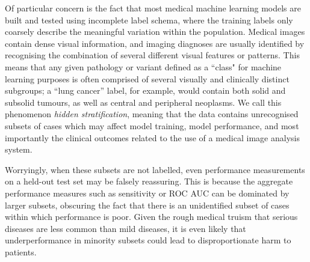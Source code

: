 \documentclass{article}
\begin{document}
Of particular concern is the fact that most medical machine learning models are built and tested using incomplete label schema, where the training labels only coarsely describe the meaningful variation within the population. 
Medical images contain dense visual information, and imaging diagnoses are usually identified by recognising the combination of several different visual features or patterns. 
This means that any given pathology or variant defined as a ``class" for machine learning purposes is often comprised of several visually and clinically distinct subgroups; a ``lung cancer'' label, for example, would contain both solid and subsolid tumours, as well as central and peripheral neoplasms. 
We call this phenomenon \textit{hidden stratification}, meaning that the data contains unrecognised subsets of cases which may affect model training, model performance, and most importantly the clinical outcomes related to the use of a medical image analysis system.  

Worryingly, when these subsets are not labelled, even performance measurements on a held-out test set may be falsely reassuring. 
This is because the aggregate performance measures such as sensitivity or ROC AUC can be dominated by larger subsets, obscuring the fact that there is an unidentified subset of cases within which performance is poor. 
Given the rough medical truism that serious diseases are less common than mild diseases, it is even likely that underperformance in minority subsets could lead to disproportionate harm to patients.
\end{document}
